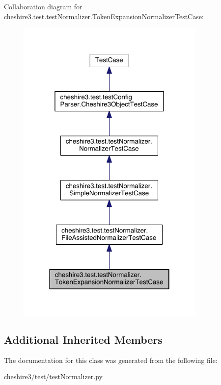 Collaboration diagram for cheshire3.\-test.\-test\-Normalizer.\-Token\-Expansion\-Normalizer\-Test\-Case\-:
\nopagebreak
\begin{figure}[H]
\begin{center}
\leavevmode
\includegraphics[width=262pt]{classcheshire3_1_1test_1_1test_normalizer_1_1_token_expansion_normalizer_test_case__coll__graph}
\end{center}
\end{figure}
\subsection*{Additional Inherited Members}


The documentation for this class was generated from the following file\-:\begin{DoxyCompactItemize}
\item 
cheshire3/test/test\-Normalizer.\-py\end{DoxyCompactItemize}
